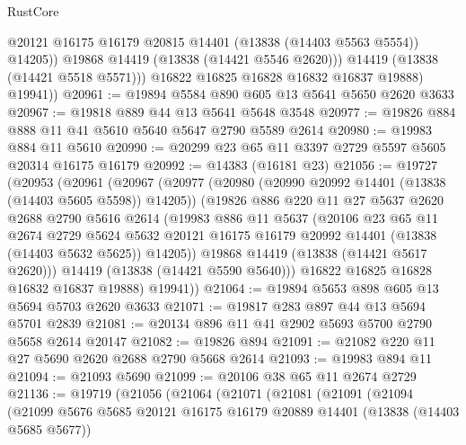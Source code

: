 \begin{lexlean}{RustCore}
\begin{coremodule}
                  @20121
                  @16175
                  @16179
                  @20815
                  @14401
                  (@13838 (@14403 @5563 @5554))
                  @14205))
              @19868
              @14419
              (@13838 (@14421 @5546 @2620)))
            @14419
            (@13838 (@14421 @5518 @5571)))
          @16822
          @16825
          @16828
          @16832
          @16837
          @19888)
        @19941))
@20961 := @19894 @5584 @890 @605 @13 @5641 @5650 @2620 @3633
@20967 := @19818 @889 @44 @13 @5641 @5648 @3548
@20977 := @19826 @884 @888 @11 @41 @5610 @5640 @5647 @2790 @5589 @2614
@20980 := @19983 @884 @11 @5610
@20990 := @20299 @23 @65 @11 @3397 @2729 @5597 @5605 @20314 @16175 @16179
@20992 := @14383 (@16181 @23)
@21056 := @19727
    (@20953
      (@20961
        (@20967
          (@20977
            (@20980 (@20990 @20992 @14401 (@13838 (@14403 @5605 @5598)) @14205))
            (@19826
              @886
              @220
              @11
              @27
              @5637
              @2620
              @2688
              @2790
              @5616
              @2614
              (@19983
                @886
                @11
                @5637
                (@20106
                  @23
                  @65
                  @11
                  @2674
                  @2729
                  @5624
                  @5632
                  @20121
                  @16175
                  @16179
                  @20992
                  @14401
                  (@13838 (@14403 @5632 @5625))
                  @14205))
              @19868
              @14419
              (@13838 (@14421 @5617 @2620)))
            @14419
            (@13838 (@14421 @5590 @5640)))
          @16822
          @16825
          @16828
          @16832
          @16837
          @19888)
        @19941))
@21064 := @19894 @5653 @898 @605 @13 @5694 @5703 @2620 @3633
@21071 := @19817 @283 @897 @44 @13 @5694 @5701 @2839
@21081 := @20134 @896 @11 @41 @2902 @5693 @5700 @2790 @5658 @2614 @20147
@21082 := @19826 @894
@21091 := @21082 @220 @11 @27 @5690 @2620 @2688 @2790 @5668 @2614
@21093 := @19983 @894 @11
@21094 := @21093 @5690
@21099 := @20106 @38 @65 @11 @2674 @2729
@21136 := @19719
    (@21056
      (@21064
        (@21071
          (@21081
            (@21091
              (@21094
                (@21099
                  @5676
                  @5685
                  @20121
                  @16175
                  @16179
                  @20889
                  @14401
                  (@13838 (@14403 @5685 @5677))

\end{coremodule}
\end{lexlean}
